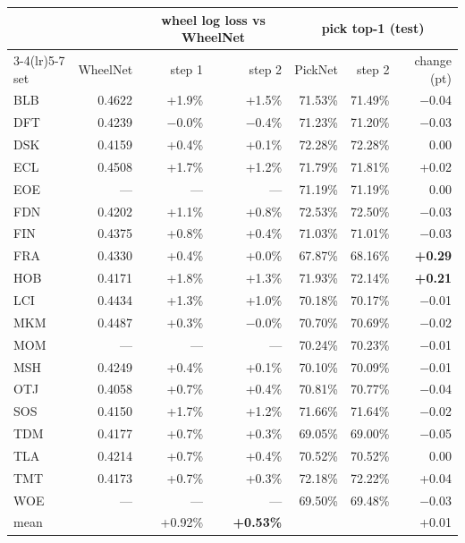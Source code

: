 \documentclass[11pt,letterpaper]{article}
\begin{document}
\begin{center}\small
\begin{tabular}{lrrrrrr}
\toprule
& & \multicolumn{2}{c}{wheel log loss vs WheelNet} & \multicolumn{3}{c}{pick top-1 (test)} \\
\cmidrule(lr){3-4}\cmidrule(lr){5-7}
set & WheelNet & step 1 & step 2 & PickNet & step 2 & change (pt) \\
\midrule
BLB & 0.4622 & +1.9\% & +1.5\% & 71.53\% & 71.49\% & $-$0.04 \\
DFT & 0.4239 & $-$0.0\% & $-$0.4\% & 71.23\% & 71.20\% & $-$0.03 \\
DSK & 0.4159 & +0.4\% & +0.1\% & 72.28\% & 72.28\% & 0.00 \\
ECL & 0.4508 & +1.7\% & +1.2\% & 71.79\% & 71.81\% & +0.02 \\
EOE & --- & --- & --- & 71.19\% & 71.19\% & 0.00 \\
FDN & 0.4202 & +1.1\% & +0.8\% & 72.53\% & 72.50\% & $-$0.03 \\
FIN & 0.4375 & +0.8\% & +0.4\% & 71.03\% & 71.01\% & $-$0.03 \\
FRA & 0.4330 & +0.4\% & +0.0\% & 67.87\% & 68.16\% & \textbf{+0.29} \\
HOB & 0.4171 & +1.8\% & +1.3\% & 71.93\% & 72.14\% & \textbf{+0.21} \\
LCI & 0.4434 & +1.3\% & +1.0\% & 70.18\% & 70.17\% & $-$0.01 \\
MKM & 0.4487 & +0.3\% & $-$0.0\% & 70.70\% & 70.69\% & $-$0.02 \\
MOM & --- & --- & --- & 70.24\% & 70.23\% & $-$0.01 \\
MSH & 0.4249 & +0.4\% & +0.1\% & 70.10\% & 70.09\% & $-$0.01 \\
OTJ & 0.4058 & +0.7\% & +0.4\% & 70.81\% & 70.77\% & $-$0.04 \\
SOS & 0.4150 & +1.7\% & +1.2\% & 71.66\% & 71.64\% & $-$0.02 \\
TDM & 0.4177 & +0.7\% & +0.3\% & 69.05\% & 69.00\% & $-$0.05 \\
TLA & 0.4214 & +0.7\% & +0.4\% & 70.52\% & 70.52\% & 0.00 \\
TMT & 0.4173 & +0.7\% & +0.3\% & 72.18\% & 72.22\% & +0.04 \\
WOE & --- & --- & --- & 69.50\% & 69.48\% & $-$0.03 \\
\midrule
mean & & +0.92\% & \textbf{+0.53\%} & & & +0.01 \\
\bottomrule
\end{tabular}
\end{center}
\end{document}
